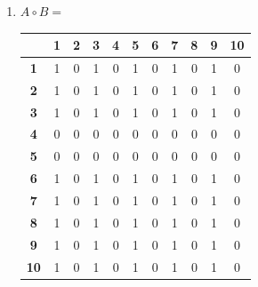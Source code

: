 \documentclass[a4paper,14pt]{extarticle}
\begin{document}
\begin{enumerate}[label=1.\arabic*.]
	      \begin{enumerate}[1) ]\item
		            $A\circ B = $  \begin{tabular}{|c|c|c|c|c|c|c|c|c|c|c|}
			            \hline
			                              & \textbf{1} & \textbf{2} & \textbf{3} & \textbf{4} & \textbf{5} & \textbf{6} & \textbf{7} & \textbf{8} & \textbf{9} & \textbf{10} \\
			            \hline\textbf{1}  & 1          & 0          & 1          & 0          & 1          & 0          & 1          & 0          & 1          & 0           \\
			            \hline\textbf{2}  & 1          & 0          & 1          & 0          & 1          & 0          & 1          & 0          & 1          & 0           \\
			            \hline\textbf{3}  & 1          & 0          & 1          & 0          & 1          & 0          & 1          & 0          & 1          & 0           \\
			            \hline\textbf{4}  & 0          & 0          & 0          & 0          & 0          & 0          & 0          & 0          & 0          & 0           \\
			            \hline\textbf{5}  & 0          & 0          & 0          & 0          & 0          & 0          & 0          & 0          & 0          & 0           \\
			            \hline\textbf{6}  & 1          & 0          & 1          & 0          & 1          & 0          & 1          & 0          & 1          & 0           \\
			            \hline\textbf{7}  & 1          & 0          & 1          & 0          & 1          & 0          & 1          & 0          & 1          & 0           \\
			            \hline\textbf{8}  & 1          & 0          & 1          & 0          & 1          & 0          & 1          & 0          & 1          & 0           \\
			            \hline\textbf{9}  & 1          & 0          & 1          & 0          & 1          & 0          & 1          & 0          & 1          & 0           \\
			            \hline\textbf{10} & 1          & 0          & 1          & 0          & 1          & 0          & 1          & 0          & 1          & 0           \\
			            \hline
		            \end{tabular}

\end{enumerate}
\end{enumerate}
\end{document}
